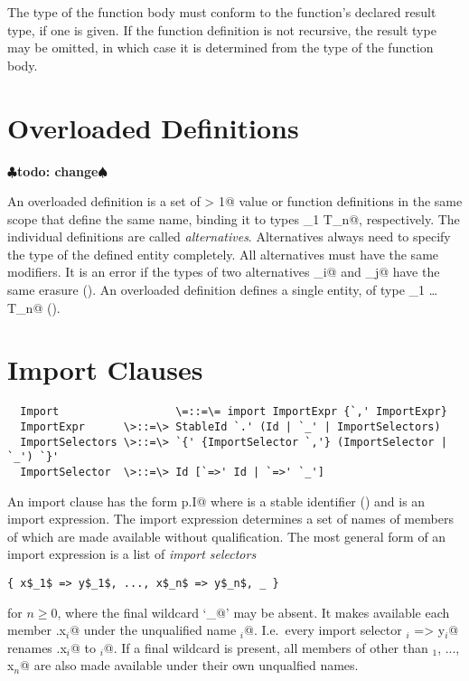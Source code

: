 \documentclass[11pt]{report}
\renewcommand{\todo}[1]{{$\clubsuit$\bf todo: #1$\spadesuit$}}
\begin{document}
The type of the function body must conform to the function's declared
result type, if one is given. If the function definition is not
recursive, the result type may be omitted, in which case it is
determined from the type of the function body.


\section{Overloaded Definitions}
\label{sec:overloaded-defs}
\todo{change}

An overloaded definition is a set of \verb@n > 1@ value or function
definitions in the same scope that define the same name, binding it to
types \verb@T_1 \commadots T_n@, respectively.  The individual
definitions are called {\em alternatives}.  Alternatives always need
to specify the type of the defined entity completely.  All
alternatives must have the same modifiers. It is an error if the types
of two alternatives \verb@T_i@ and \verb@T_j@ have the same erasure
().  An overloaded definition defines a single
entity, of type \verb@T_1 \overload \ldots \overload T_n@
().

\section{Import Clauses}
\label{sec:import}

\syntax\begin{verbatim}
  Import                  \=::=\= import ImportExpr {`,' ImportExpr}
  ImportExpr      \>::=\> StableId `.' (Id | `_' | ImportSelectors)
  ImportSelectors \>::=\> `{' {ImportSelector `,'} (ImportSelector | `_') `}'
  ImportSelector  \>::=\> Id [`=>' Id | `=>' `_']
\end{verbatim}

An import clause has the form \verb@import p.I@ where \verb@p@ is a stable
identifier () and \verb@I@ is an import expression.
The import expression determines a set of names of members of \verb@p@
which are made available without qualification. The most general form
of an import expression is a list of {\em import selectors}
\begin{verbatim}
{ x$_1$ => y$_1$, ..., x$_n$ => y$_n$, _ }
\end{verbatim}
for $n \geq 0$, where the final wildcard `\verb@_@' may be absent.  It
makes available each member \verb@p.x$_i$@ under the unqualified name
\verb@y$_i$@. I.e.\ every import selector \verb@x$_i$ => y$_i$@ renames
\verb@p.x$_i$@ to
\verb@y$_i$@.  If a final wildcard is present, all members \verb@z@ of
\verb@p@ other than \verb@x$_1$, ..., x$_n$@ are also made available
under their own unqualfied names.
\end{document}
